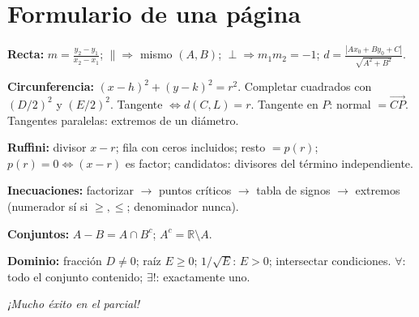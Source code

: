 \documentclass[11pt,a4paper]{article}
\theoremstyle{ej}
\newcommand{\R}{\mathbb{R}}
\begin{document}
\section{Formulario de una página}

\begin{tcolorbox}[colback=gray!5,colframe=black!60,title=Resumen para repasar antes del parcial]
\textbf{Recta:} $m=\frac{y_2-y_1}{x_2-x_1}$; $\parallel\Rightarrow$ mismo $(A,B)$; $\perp\Rightarrow m_1m_2=-1$;
$d=\frac{|Ax_0+By_0+C|}{\sqrt{A^2+B^2}}$.

\textbf{Circunferencia:} $(x-h)^2+(y-k)^2=r^2$. Completar cuadrados con $(D/2)^2$ y $(E/2)^2$.
Tangente $\iff d(C,L)=r$. Tangente en $P$: normal $=\overrightarrow{CP}$.
Tangentes paralelas: extremos de un diámetro.

\textbf{Ruffini:} divisor $x-r$; fila con ceros incluidos; resto $=p(r)$; $p(r)=0\iff(x-r)$ es factor;
candidatos: divisores del término independiente.

\textbf{Inecuaciones:} factorizar $\to$ puntos críticos $\to$ tabla de signos $\to$ extremos
(numerador sí si $\ge,\le$; denominador nunca).

\textbf{Conjuntos:} $A-B=A\cap B^c$; $A^c=\R\setminus A$.

\textbf{Dominio:} fracción $D\ne0$; raíz $E\ge0$; $1/\sqrt E$: $E>0$; intersectar condiciones.
$\forall$: todo el conjunto contenido; $\exists!$: exactamente uno.
\end{tcolorbox}

\vfill
\begin{center}
\emph{¡Mucho éxito en el parcial!}
\end{center}
\end{document}
